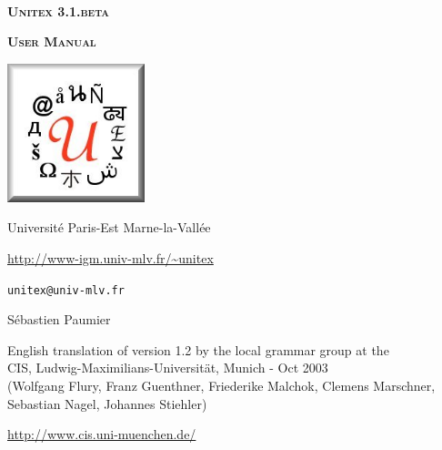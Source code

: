 
\begin{titlepage}
\begin{center}

~

\vspace{3cm}
\Huge
\textsc{\textbf{Unitex 3.1.beta}}

\vspace{1cm}

\huge
\textsc{\textbf{User Manual}}

\vspace{2cm}

  \begin{center}
    \includegraphics[width=4cm]{resources/img/logo-Unitex.png}
  \end{center}
\normalsize

\vspace{2cm}

\LARGE

Université Paris-Est Marne-la-Vallée
\bigskip
\normalsize

\url{http://www-igm.univ-mlv.fr/~unitex}

\verb$unitex@univ-mlv.fr$

\vspace{1cm}

Sébastien Paumier
\bigskip

English translation of version 1.2 by the local grammar group at the\\
 CIS, Ludwig-Maximilians-Universit\"at, Munich - Oct 2003\\
 (Wolfgang Flury, Franz Guenthner, Friederike Malchok, Clemens Marschner, 
 Sebastian Nagel, Johannes Stiehler)

\url{http://www.cis.uni-muenchen.de/}
\end{center}

\end{titlepage}
